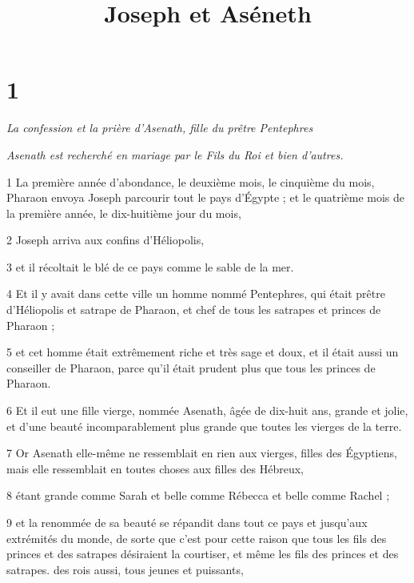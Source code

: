 


\title{Joseph et Aséneth}

\chapter{1}

\par \textit{La confession et la prière d'Asenath, fille du prêtre Pentephres}

\par \textit{Asenath est recherché en mariage par le Fils du Roi et bien d'autres.}

\par 1 La première année d'abondance, le deuxième mois, le cinquième du mois, Pharaon envoya Joseph parcourir tout le pays d'Égypte ; et le quatrième mois de la première année, le dix-huitième jour du mois,

\par 2 Joseph arriva aux confins d'Héliopolis,

\par 3 et il récoltait le blé de ce pays comme le sable de la mer.

\par 4 Et il y avait dans cette ville un homme nommé Pentephres, qui était prêtre d'Héliopolis et satrape de Pharaon, et chef de tous les satrapes et princes de Pharaon ;

\par 5 et cet homme était extrêmement riche et très sage et doux, et il était aussi un conseiller de Pharaon, parce qu'il était prudent plus que tous les princes de Pharaon.

\par 6 Et il eut une fille vierge, nommée Asenath, âgée de dix-huit ans, grande et jolie, et d'une beauté incomparablement plus grande que toutes les vierges de la terre.

\par 7 Or Asenath elle-même ne ressemblait en rien aux vierges, filles des Égyptiens, mais elle ressemblait en toutes choses aux filles des Hébreux,

\par 8 étant grande comme Sarah et belle comme Rébecca et belle comme Rachel ;

\par 9 et la renommée de sa beauté se répandit dans tout ce pays et jusqu'aux extrémités du monde, de sorte que c'est pour cette raison que tous les fils des princes et des satrapes désiraient la courtiser, et même les fils des princes et des satrapes. des rois aussi, tous jeunes et puissants,

